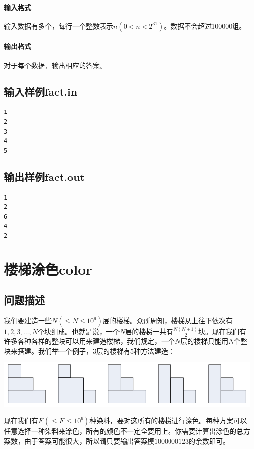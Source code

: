 \documentclass{ctexrep}
\begin{document}
\paragraph{输入格式}
输入数据有多个，每行一个整数表示$n(0<n<2^{31})$。数据不会超过100000组。

\paragraph{输出格式}
对于每个数据，输出相应的答案。

\subsection*{输入样例fact.in}
\begin{verbatim}
1
2
3
4
5
\end{verbatim}

\subsection*{输出样例fact.out}
\begin{verbatim}
1
2
6
4
2
\end{verbatim}

\newpage
\section*{楼梯涂色color}

\subsection*{问题描述}
我们要建造一些$N(\leq N\leq 10^9)$层的楼梯。众所周知，楼梯从上往下依次有$1,2,3,\dotsc,N$个块组成。也就是说，一个$N$层的楼梯一共有$\frac{N(N+1)}{2}$块。现在我们有许多各种各样的整块可以用来建造楼梯，我们规定，一个$N$层的楼梯只能用$N$个整块来搭建。我们举一个例子，$3$层的楼梯有$5$种方法建造：

\includegraphics[scale=0.4]{staircolor.png}

现在我们有$K(\leq K\leq 10^9)$种染料，要对这所有的楼梯进行涂色。每种方案可以任意选择一种染料来涂色，所有的颜色不一定全要用上。你需要计算出涂色的总方案数，由于答案可能很大，所以请只要输出答案模$1000000123$的余数即可。
\end{document}
